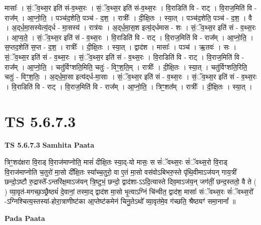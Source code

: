 \documentclass[17pt]{extarticle}
\begin{document}
मासाः᳚ । सं॒ॅव॒थ्स॒र इति॑ सं-व॒थ्स॒रः । सं॒ॅव॒थ्स॒र इति॑ सं-व॒थ्स॒रः । वि॒राडिति॑ वि -   राट् । वि॒राज॒मिति॑ वि - राज᳚म् । आ॒प्नो॒ति॒ । पञ्च॑द॒शेति॒ पञ्च॑ - द॒श॒ । रात्रीः᳚ । दी॒क्षि॒तः । स्या॒त् । पञ्च॑द॒शेति॒ पञ्च॑ - द॒श॒ । वै । अ॒द्‌र्ध॒मा॒सस्येत्य॒॑द्‌र्ध - मा॒सस्य॑ ।   रात्र॑यः । अ॒द्‌र्ध॒मा॒स॒श इत्य॒॑द्‌र्धमास -   शः । सं॒ॅव॒थ्स॒र इति॑ सं - व॒थ्स॒रः । आ॒प्य॒ते॒ । सं॒ॅव॒थ्स॒र इति॑ सं - व॒थ्स॒रः । वि॒राडिति॑ वि - राट् । वि॒राज॒मिति॑ वि - राज᳚म् । आ॒प्नो॒ति॒ । स॒प्तद॒शेति॑ स॒प्त - द॒श॒ । रात्रीः᳚ । दी॒क्षि॒तः । स्या॒त् । द्वाद॑श । मासाः᳚ । पञ्च॑ । ऋ॒तवः॑ । सः । सं॒ॅव॒थ्स॒र इति॑ सं - व॒थ्स॒रः । सं॒ॅव॒थ्स॒र इति॑ सं - व॒थ्स॒रः । वि॒राडिति॑ वि - राट् । वि॒राज॒मिति॑ वि - राज᳚म् । आ॒प्नो॒ति॒ । चतु॑र्विꣳशति॒मिति॒ चतुः॑ - विꣳ॒॒श॒ति॒म् । रात्रीः᳚ । दी॒क्षि॒तः । स्या॒त् । चतु॑र्विꣳशति॒रिति॒ चतुः॑ - विꣳ॒॒श॒तिः॒ । अ॒द्‌र्ध॒मा॒सा इत्य॑द्‌र्ध-मा॒साः । सं॒ॅव॒थ्स॒र इति॑ सं - व॒थ्स॒रः । सं॒ॅव॒थ्स॒र इति॑ सं - व॒थ्स॒रः । वि॒राडिति॑ वि - राट् । वि॒राज॒मिति॑ वि - राज᳚म् । आ॒प्नो॒ति॒ । त्रिꣳ॒॒शत᳚म् । रात्रीः᳚ । दी॒क्षि॒तः । स्या॒त् ।  \newline





\section{ TS 5.6.7.3 }

\textbf{TS 5.6.7.3 } \newline
\textbf{Samhita Paata} \newline

त्रिꣳ॒॒शद॑क्षरा वि॒राड् वि॒राज॑माप्नोति॒ मासं॑ दीक्षि॒तः स्या॒द्-यो मासः॒ स सं॑ॅवथ्स॒रः सं॑ॅवथ्स॒रो वि॒राड् वि॒राज॑माप्नोति च॒तुरो॑ मा॒सो दी᳚क्षि॒तः स्या᳚च्च॒तुरो॒ वा ए॒तं मा॒सो वस॑वोऽबिभरु॒स्ते पृ॑थि॒वीमाऽज॑यन् गाय॒त्रीं छन्दो॒ऽष्टौ रु॒द्रास्ते᳚-ऽन्तरि॑क्ष॒माऽज॑यन् त्रि॒ष्टुभं॒ छन्दो॒ द्वाद॑शा-ऽऽदि॒त्यास्ते दिव॒माऽज॑य॒न् जग॑तीं॒ छन्द॒स्ततो॒ वै ते ( ) व्या॒वृत॑-मगच्छ॒ञ्छ्रैष्ठ्यं॑ दे॒वानां॒ तस्मा॒द् द्वाद॑श मा॒सो भृ॒त्वाऽग्निं चि॑न्वीत॒ द्वाद॑श॒ मासाः᳚ संॅवथ्स॒रः सं॑ॅवथ्स॒रो᳚ -ऽग्निश्चित्य॒स्तस्या॑-होरा॒त्राणीष्ट॑का आ॒प्तेष्ट॑कमेनं चिनु॒तेऽथो᳚ व्या॒वृत॑मे॒व ग॑च्छति॒ श्रैष्ठ्यꣳ॑ समा॒नानां᳚ ॥ \newline

\textbf{Pada Paata} \newline
\end{document}
